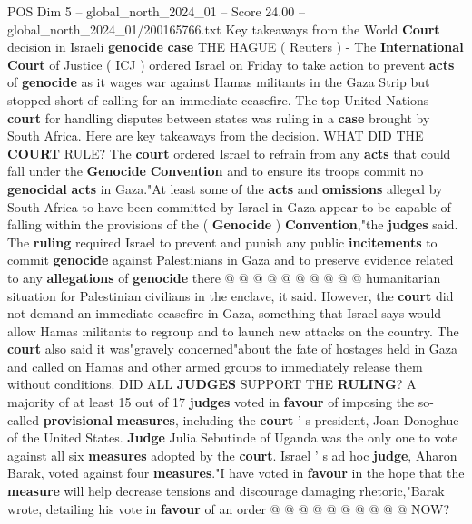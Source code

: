 \begin{textsample}{POS Dim 5 – global\_north\_2024\_01 – Score 24.00 – global\_north\_2024\_01/200165766.txt}  \label{ex:f5_pos_111}
Key takeaways from the World \textbf{Court} decision in Israeli \textbf{genocide} \textbf{case} THE HAGUE ( Reuters ) - The \textbf{International} \textbf{Court} of Justice ( ICJ ) ordered Israel on Friday to take action to prevent \textbf{acts} of \textbf{genocide} as it wages war against Hamas militants in the Gaza Strip but stopped short of calling for an immediate ceasefire.
The top United Nations \textbf{court} for handling disputes between states was ruling in a \textbf{case} brought by South Africa.
Here are key takeaways from the decision.
WHAT DID THE \textbf{COURT} RULE?
The \textbf{court} ordered Israel to refrain from any \textbf{acts} that could fall under the \textbf{Genocide} \textbf{Convention} and to ensure its troops commit no \textbf{genocidal} \textbf{acts} in Gaza."At least some of the \textbf{acts} and \textbf{omissions} alleged by South Africa to have been committed by Israel in Gaza appear to be capable of falling within the provisions of the ( \textbf{Genocide} ) \textbf{Convention},"the \textbf{judges} said.
The \textbf{ruling} required Israel to prevent and punish any public \textbf{incitements} to commit \textbf{genocide} against Palestinians in Gaza and to preserve evidence related to any \textbf{allegations} of \textbf{genocide} there @ @ @ @ @ @ @ @ @ @ humanitarian situation for Palestinian civilians in the enclave, it said.
However, the \textbf{court} did not demand an immediate ceasefire in Gaza, something that Israel says would allow Hamas militants to regroup and to launch new attacks on the country.
The \textbf{court} also said it was"gravely concerned"about the fate of hostages held in Gaza and called on Hamas and other armed groups to immediately release them without conditions.
DID ALL \textbf{JUDGES} SUPPORT THE \textbf{RULING}?
A majority of at least 15 out of 17 \textbf{judges} voted in \textbf{favour} of imposing the so-called \textbf{provisional} \textbf{measures}, including the \textbf{court} ' s president, Joan Donoghue of the United States. \textbf{Judge} Julia Sebutinde of Uganda was the only one to vote against all six \textbf{measures} adopted by the \textbf{court}.
Israel ' s ad hoc \textbf{judge}, Aharon Barak, voted against four \textbf{measures}."I have voted in \textbf{favour} in the hope that the \textbf{measure} will help decrease tensions and discourage damaging rhetoric,"Barak wrote, detailing his vote in \textbf{favour} of an order @ @ @ @ @ @ @ @ @ @ NOW?

\end{textsample}
